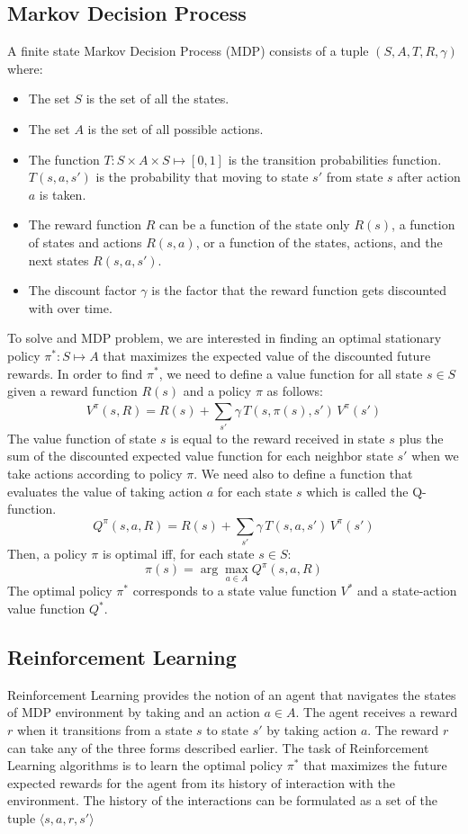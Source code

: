 \documentclass[conference]{IEEEtran}
\begin{document}
\subsection{Markov Decision Process}
A finite state Markov Decision Process (MDP) \cite{puterman2014markov} consists of a tuple $(S,A,T,R,\gamma)$ where:
\begin{itemize}
    \item The set $S$ is the set of all the states.
    \item The set $A$ is the set of all possible actions.
    \item The function $T : S\times A\times S \mapsto [0,1]$ is the transition probabilities function. $T(s,a,s')$ is the probability that moving to state $s'$ from state $s$ after action $a$ is taken.
    \item The reward function $R$ can be a function of the state only $R(s)$, a function of states and actions $R(s,a)$, or a function of the states, actions, and the next states $R(s,a,s')$.
    \item The discount factor $\gamma$ is the factor that the reward function gets discounted with over time.
\end{itemize}
To solve and MDP problem, we are interested in finding an optimal stationary policy $\pi^*: S \mapsto A$ that maximizes the expected value of the discounted future rewards.
In order to find $\pi^*$, we need to define a value function for all state $s \in S$ given a reward function $R(s)$ and a policy $\pi$ as follows:
\[ V^\pi(s,R) = R(s) + \sum_{s'}^{}\gamma\,T(s,\pi(s),s')\,V^\pi(s') \]
The value function of state $s$ is equal to the reward received in state $s$ plus the sum of the discounted expected value function for each neighbor state $s'$ when we take actions according to policy $\pi$.
We need also to define a function that evaluates the value of taking action $a$ for each state $s$ which is called the Q-function.
\[Q^\pi(s,a,R) = R(s) + \sum_{s'}{} \gamma\,T(s,a,s')\,V^\pi(s') \]
Then, a policy $\pi$ is optimal iff, for each state $s \in S$:
\[ \pi(s) = \arg\!\max_{a\in A} Q^\pi(s,a,R)\]
The optimal policy $\pi^*$ corresponds to a state value function $V^*$ and a state-action value function $Q^*$.

\subsection{Reinforcement Learning}
Reinforcement Learning provides the notion of an agent that navigates the states of MDP environment by taking and an action $a \in A$. The agent receives a reward $r$ when it transitions from a state $s$ to state $s'$ by taking action $a$. The reward $r$ can take any of the three forms described earlier. The task of Reinforcement Learning algorithms is to learn the optimal policy $\pi^*$ that maximizes the future expected rewards for the agent from its history of interaction with the environment. The history of the interactions can be formulated as a set of the tuple $\big \langle s,a,r,s' \big \rangle$
\end{document}
